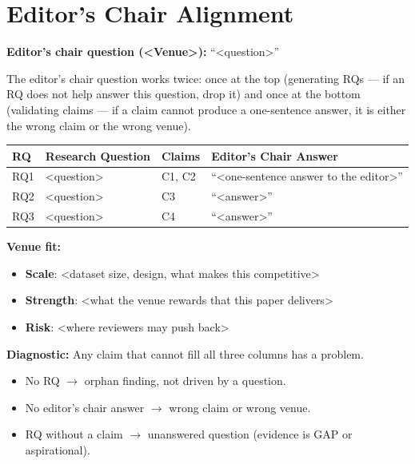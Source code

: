 \documentclass[11pt]{article}
\begin{document}
\section*{Editor's Chair Alignment}

\textbf{Editor's chair question (<Venue>):} ``<question>''

The editor's chair question works twice: once at the top (generating RQs ---
if an RQ does not help answer this question, drop it) and once at the bottom
(validating claims --- if a claim cannot produce a one-sentence answer, it is
either the wrong claim or the wrong venue).

\bigskip

\begin{small}
\begin{tabularx}{\textwidth}{@{}p{} p{} p{} X@{}}
\toprule
RQ & Research Question & Claims & Editor's Chair Answer \\
\midrule
RQ1 & <question> & C1, C2 & ``<one-sentence answer to the editor>'' \\
\addlinespace
RQ2 & <question> & C3 & ``<answer>'' \\
\addlinespace
RQ3 & <question> & C4 & ``<answer>'' \\
\bottomrule
\end{tabularx}
\end{small}

\bigskip

\textbf{Venue fit:}
\begin{itemize}
\item \textbf{Scale}: <dataset size, design, what makes this competitive>
\item \textbf{Strength}: <what the venue rewards that this paper delivers>
\item \textbf{Risk}: <where reviewers may push back>
\end{itemize}

\textbf{Diagnostic:} Any claim that cannot fill all three columns has a problem.
\begin{itemize}
\item No RQ $\to$ orphan finding, not driven by a question.
\item No editor's chair answer $\to$ wrong claim or wrong venue.
\item RQ without a claim $\to$ unanswered question (evidence is GAP or aspirational).
\end{itemize}
\end{document}
